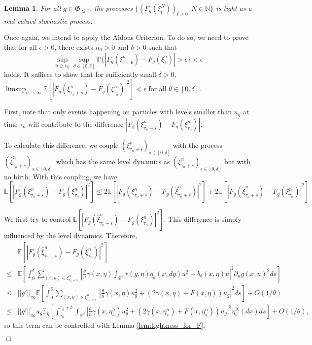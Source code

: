 \documentclass[12pt]{article}
\newenvironment {proof}{{\noindent\bf Proof }}{\hfill $\Box$ \medskip}
\newtheorem{lemma}[theorem]{Lemma}
\def \hat{\widehat}
\newcommand{\IR}{\mathbb R}
\begin{document}
\begin{lemma}
For all $g \in \mathfrak{G}_{\leq 1}$, the processes $\{(F_g(\xi^N_t))_{t \geq 0}: N \in \mathbb{N}\}$ is tight as a real-valued stochastic process.
\end{lemma}
\begin{proof}
Once again, we intend to apply the Aldous Criterion. 
To do so, we need to prove that for all $\epsilon > 0$,
there exists $n_0 > 0$ and $\delta > 0$ such that 
\begin{equation}
\sup_{n \geq n_0}\sup_{\theta \in [0, \delta]}\mathbb{P}\{|F_g(\xi^n_{\tau+\theta})-F_g(\xi^n_{\tau})| > \epsilon\} < \epsilon
\end{equation} 
holds. 
It suffices to show that for sufficiently small $\delta > 0$,
$\limsup_{n \to \infty}\mathbb{E}[|F_g(\xi^n_{\tau_n + s})-F_g(\xi^n_{\tau_n})|^2] < \epsilon$
for all $\theta \in [0, \delta]$.

First, note that only events happening on particles with levels smaller than $u_g$ at time $\tau_n$ will contribute to the difference $|F_g(\xi^n_{\tau_n + s})-F_g(\xi^n_{\tau_n})|$.

To calculate this difference, we couple $(\xi^n_{\tau_n + s})_{s \in [0,\delta]}$ with the process $(\hat{\xi}^n_{\tau_n + s})_{s \in [0,\delta]}$ which has the same level dynamics as $(\xi^n_{\tau_n + s})_{s \in [0,\delta]}$ but with no birth. 
With this coupling, 
we have 
$\mathbb{E}[|F_g(\xi^n_{\tau_n + s})-F_g(\xi^n_{\tau_n})|^2] \leq 2\mathbb{E}[|F_g(\xi^n_{\tau_n + s})-F_g(\hat{\xi}^n_{\tau_n + s})|^2]+ 2\mathbb{E}[|F_g(\hat{\xi}^n_{\tau_n + s})-F_g(\xi^n_{\tau_n})|^2]$

We first try to control $\mathbb{E}[|F_g(\hat{\xi}^n_{\tau_n + s})-F_g(\xi^n_{\tau_n})|^2]$. 
This difference is simply influenced by the level dynamics. Therefore,
\begin{equation}
\begin{aligned}
 &\mathbb{E}[|F_g(\hat{\xi}^n_{\tau_n + s})-F_g(\xi^n_{\tau_n})|^2]\\
 \leq &
 \mathbb{E}\left[ \int_{0}^{\delta} \sum_{(x,u)\in\xi^n_{\tau_n+s}}\,
    \left|
        \frac{\theta}{n} \gamma(x,\eta) \int_{\IR^d} r(y, \eta) q_\theta(x, dy) u^2 -b_{\theta}(x,\eta)u
    \right|^2 \partial_u g(x,u)^2 ds\right]\\
 \leq & ||g'||_{\infty}
 \mathbb{E}\left[ \int_{0}^{\delta} \sum_{(x,u)\in\xi^n_{\tau_n+s}}\,
    \left| \frac{\theta}{n}  \gamma(x,\eta)  u_g^2 + (2  \gamma(x,\eta) + F(x,\eta))u_g
    \right|^2  ds\right] + O(1/\theta)\\
\leq & ||g'||_{\infty}u_g
 \mathbb{E}_{\eta}\left[ \int_{\tau_n}^{\tau_n+\delta} \int_{\mathbb{R}^d}
    \left| \frac{\theta}{n}  \gamma(x,\eta^n_{s})  u_g^2 + (2  \gamma(x,\eta^n_{s}) + F(x,\eta^n_{s}))u_g
    \right|^2 \eta^N_s(dx) ds\right] + O(1/\theta),
\end{aligned}
\end{equation}
so this term can be controlled with Lemma \ref{lem:tightness_for_F}.


\end{proof}
\end{document}

